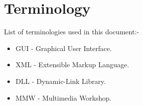 \documentclass[conference]{IEEEtran}
\begin{document}
    \section{Terminology}
      List of terminologies used in this document:-
      \begin{itemize}
        \item GUI - Graphical User Interface.
        \item XML - Extensible Markup Language.
        \item DLL - Dynamic-Link Library.
        \item MMW - Multimedia Workshop.
      \end{itemize}
  
	\renewcommand\refname{\section{Reference List}}
	\small{
    }
\end{document}
